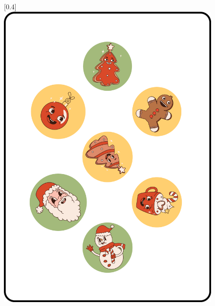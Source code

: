 \documentclass[11pt, parskip=half]{scrartcl}
\begin{document}
\vfill
     
      \begin{figure}[ht]
      \centering
      [0.4\textwidth]{\includegraphics[scale=0.25]{Images/target_card_1_display.png}}\qquad

\end{figure}
\end{document}
